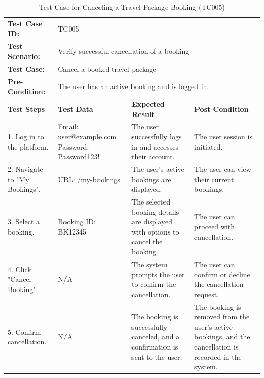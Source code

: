 \documentclass{scrreprt}
\begin{document}
\begin{longtable}{| m{2cm} | m{5cm} | m{4cm} | m{3cm} |}
\caption{Test Case for Canceling a Travel Package Booking (TC005)}
\vspace{0.5cm} \\ \hline
\textbf{Test Case ID:} & \multicolumn{3}{l|}{TC005} \\ \hline
\textbf{Test Scenario:} & \multicolumn{3}{l|}{Verify successful cancellation of a booking} \\ \hline
\textbf{Test Case:} & \multicolumn{3}{l|}{Cancel a booked travel package} \\ \hline
\textbf{Pre-Condition:} & \multicolumn{3}{l|}{The user has an active booking and is logged in.} \\ \hline
\textbf{Test Steps} & \textbf{Test Data} & \textbf{Expected Result} & \textbf{Post Condition} \\ \hline
1. Log in to the platform. & Email: user@example.com \newline Password: Password123! & The user successfully logs in and accesses their account. & The user session is initiated. \\ \hline
2. Navigate to "My Bookings". & URL: /my-bookings & The user's active bookings are displayed. & The user can view their current bookings. \\ \hline
3. Select a booking. & Booking ID: BK12345 & The selected booking details are displayed with options to cancel the booking. & The user can proceed with cancellation. \\ \hline
4. Click "Cancel Booking". & N/A & The system prompts the user to confirm the cancellation. & The user can confirm or decline the cancellation request. \\ \hline
5. Confirm cancellation. & N/A & The booking is successfully canceled, and a confirmation is sent to the user. & The booking is removed from the user's active bookings, and the cancellation is recorded in the system. \\ \hline
\end{longtable}
\end{document}
